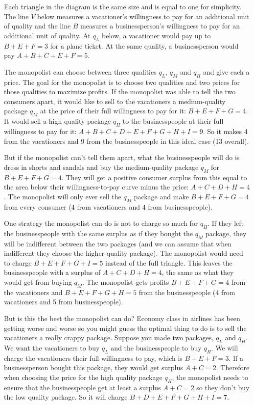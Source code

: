 \documentclass{article}
\begin{document}
Each triangle in the diagram is the same size and is equal to one for simplicity. The line $V$ below measures a vacationer's willingness to pay for an additional unit of quality and the line $B$ measures a businessperson's willingness to pay for an additional unit of quality. At $q_L$ below, a vacationer would pay up to $B+E+F=3$ for a plane ticket. At the same quality, a businessperson would pay $A+B+C+E+F=5$.

The monopolist can choose between three qualities $q_L$, $q_M$ and $q_H$ and give each a price. The goal for the monopolist is to choose two qualities and two prices for those qualities to maximize profits. If the monopolist was able to tell the two consumers apart, it would like to sell to the vacationers a medium-quality package $q_M$ at the price of their full willingness to pay for it: $B+E+F+G=4$. It would sell a high-quality package $q_H$ to the businesspeople at their full willingness to pay for it: $A+B+C+D+E+F+G+H+I=9$. So it makes 4 from the vacationers and 9 from the businesspeople in this ideal case (13 overall).

But if the monopolist can't tell them apart, what the businesspeople will do is dress in shorts and sandals and buy the medium-quality package $q_M$ for $B+E+F+G=4$. They will get a positive consumer surplus from this equal to the area below their willingness-to-pay curve minus the price: $A+C+D+H=4$. The monopolist will only ever sell the $q_M$ package and make $B+E+F+G=4$ from every consumer (4 from vacationers and 4 from businesspeople).

One strategy the monopolist can do is not to charge so much for $q_H$. If they left the businesspeople with the same surplus as if they bought the $q_M$ package, they will be indifferent between the two packages (and we can assume that when indifferent they choose the higher-quality package). The monopolist would need to charge $B+E+F+G+I=5$ instead of the full triangle. This leaves the businesspeople with a surplus of $A+C+D+H=4$, the same as what they would get from buying $q_M$. The monopolist gets profits $B+E+F+G=4$ from the vacationers and $B+E+F+G+H=5$ from the businesspeople (4 from vacationers and 5 from businesspeople).

But is this the best the monopolist can do? Economy class in airlines has been getting worse and worse so you might guess the optimal thing to do is to sell the vacationers a really crappy package. Suppose you made two packages, $q_L$ and $q_H$. We want the vacationers to buy $q_L$ and the businesspeople to buy $q_H$. We will charge the vacationers their full willingness to pay, which is $B+E+F=3$. If a businessperson bought this package, they would get surplus $A+C=2$. Therefore when choosing the price for the high quality package $q_H$, the monopolist needs to ensure that the businesspeople get at least a surplus $A+C=2$ so they don't buy the low quality package. So it will charge $B+D+E+F+G+H+I=7$.
\end{document}
